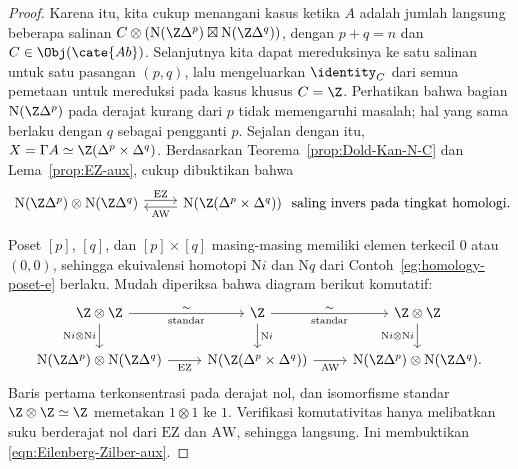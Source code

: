 \begin{proof}
	Karena itu, kita cukup menangani kasus ketika $A$ adalah jumlah
	langsung beberapa salinan
	$C\otimes(\mathrm{N}(\Z\Delta^p)\boxtimes
	\mathrm{N}(\Z\Delta^q))$, dengan $p+q=n$ dan
	$C\in\Obj(\cate{Ab})$. Selanjutnya kita dapat mereduksinya ke satu
	salinan untuk satu pasangan $(p,q)$, lalu mengeluarkan $\identity_C$
	dari semua pemetaan untuk mereduksi pada kasus khusus $C=\Z$.
	Perhatikan bahwa bagian $\mathrm{N}(\Z\Delta^p)$ pada derajat kurang dari
	$p$ tidak memengaruhi masalah; hal yang sama berlaku dengan $q$ sebagai
	pengganti $p$. Sejalan dengan itu,
	$X=\Gamma A\simeq\Z(\Delta^p\times\Delta^q)$. Berdasarkan
	Teorema~\ref{prop:Dold-Kan-N-C} dan Lema~\ref{prop:EZ-aux}, cukup
	dibuktikan bahwa
	\begin{equation}\label{eqn:Eilenberg-Zilber-aux}
		\begin{tikzcd}
			\mathrm{N}(\Z\Delta^p) \otimes \mathrm{N}(\Z\Delta^q) \arrow[shift left, r, "\mathrm{EZ}"] & \mathrm{N}(\Z(\Delta^p \times \Delta^q)) \arrow[shift left, l, "\mathrm{AW}"]
		\end{tikzcd}
		\; \text{saling invers pada tingkat homologi.}
	\end{equation}

	Poset $[p]$, $[q]$, dan $[p]\times[q]$ masing-masing memiliki elemen
	terkecil $0$ atau $(0,0)$, sehingga ekuivalensi homotopi $\mathrm{N}i$
	dan $\mathrm{N}q$ dari Contoh~\ref{eg:homology-poset-e} berlaku. Mudah
	diperiksa bahwa diagram berikut komutatif:
	\begin{equation*}\begin{tikzcd}
		\Z \otimes \Z \arrow[d, "{\mathrm{N}i \otimes \mathrm{N}i}"'] \arrow[r, "\sim", "\text{standar}"'] & \Z \arrow[d, "{\mathrm{N}i}"] \arrow[r, "\sim", "\text{standar}"'] & \Z \otimes \Z \arrow[d, "{\mathrm{N}i \otimes \mathrm{N}i}"'] \\
		\mathrm{N}(\Z\Delta^p) \otimes \mathrm{N}(\Z\Delta^q) \arrow[r, "\mathrm{EZ}"'] & \mathrm{N}(\Z(\Delta^p \times \Delta^q)) \arrow[r, "\mathrm{AW}"'] & \mathrm{N}(\Z\Delta^p) \otimes \mathrm{N}(\Z\Delta^q).
	\end{tikzcd}\end{equation*}
	Baris pertama terkonsentrasi pada derajat nol, dan isomorfisme standar
	$\Z\otimes\Z\simeq\Z$ memetakan $1\otimes1$ ke $1$. Verifikasi
	komutativitas hanya melibatkan suku berderajat nol dari $\mathrm{EZ}$
	dan $\mathrm{AW}$, sehingga langsung. Ini membuktikan
	\eqref{eqn:Eilenberg-Zilber-aux}.


\end{proof}
